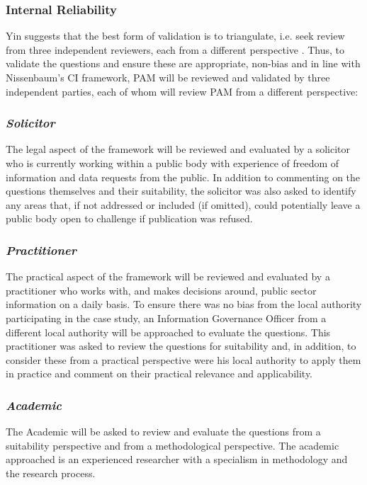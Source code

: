 \subsubsection{Internal Reliability}
Yin suggests that the best form of validation is to triangulate, i.e. seek review from three independent reviewers, each from a different perspective  \citep{Yin_CS_Design2013}. Thus, to validate the questions and ensure these are appropriate, non-bias and in line with Nissenbaum's CI framework, PAM will be reviewed and validated by three independent parties, each of whom will review PAM from a different perspective:
 
\subsubsection{\it Solicitor}

The legal aspect of the framework will be reviewed and evaluated by a solicitor who is currently working within a public body with experience of freedom of information and data requests from the public. In addition to commenting on the questions themselves and their suitability, the solicitor was also asked to identify any areas that, if not addressed or included (if omitted), could potentially leave a public body open to challenge if publication was refused.

\subsubsection{\it Practitioner}

The practical aspect of the framework will be reviewed and evaluated by a practitioner who works with, and makes decisions around, public sector information on a daily basis. To ensure there was no bias from the local authority participating in the case study, an Information Governance Officer from a different local authority will be approached to evaluate the questions. This practitioner was asked to review the questions for suitability and, in addition, to consider these from a practical perspective were his local authority to apply them in practice and comment on their practical relevance and applicability.

\subsubsection{\it Academic}

The Academic will be asked to review and evaluate the questions from a suitability perspective and from a methodological perspective. The academic approached is an experienced researcher with a specialism in methodology and the research process.

